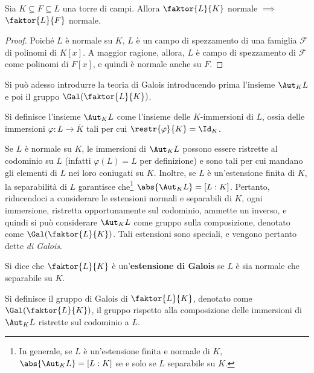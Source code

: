\documentclass[12pt]{scrartcl}
\begin{document}
	\begin{proposition}
		Sia $K \subseteq F \subseteq L$ una torre di campi. Allora
		$\faktor{L}{K}$ normale $\implies$ $\faktor{L}{F}$
		normale.
	\end{proposition}

	\begin{proof}
		Poiché $L$ è normale su $K$, $L$ è un campo di
		spezzamento di una famiglia $\mathcal{F}$ di polinomi
		di $K[x]$. A maggior ragione, allora,
		$L$ è campo di spezzamento di $\mathcal{F}$ come
		polinomi di $F[x]$, e quindi è normale anche su $F$.
	\end{proof} \medskip

	Si può adesso introdurre la teoria di Galois introducendo
	prima l'insieme $\Aut_K L$ e poi il gruppo $\Gal(\faktor{L}{K})$.
	
	\begin{definition}
		Si definisce l'insieme $\Aut_K L$ come l'insieme
		delle $K$-immersioni di $L$, ossia delle immersioni
		$\varphi : L \to \overline{K}$ tali per cui
		$\restr{\varphi}{K} = \Id_K$.
	\end{definition}

	Se $L$ è normale su $K$, le immersioni di
	$\Aut_K L$ possono essere ristrette al codominio su
	$L$ (infatti $\varphi(L) = L$ per definizione) e sono
	tali per cui mandano gli elementi di $L$ nei loro
	coniugati su $K$. Inoltre, se $L$ è un'estensione finita
	di $K$, la separabilità di $L$ garantisce che\footnote{
		In generale, se $L$ è un'estensione finita e normale di $K$,
		$\abs{\Aut_K L} = [L : K]$ se e solo se $L$
		separabile su $K$.
	}
	$\abs{\Aut_K L} = [L : K]$. Pertanto, riducendoci a
	considerare le estensioni normali e separabili di $K$,
	ogni immersione, ristretta opportunamente sul codominio,
	ammette un inverso, e quindi si può considerare
	$\Aut_K L$ come gruppo sulla composizione, denotato
	come $\Gal(\faktor{L}{K})$. Tali estensioni sono
	speciali, e vengono pertanto dette \textit{di Galois}.
	
	\begin{definition}
		Si dice che $\faktor{L}{K}$ è un'\textbf{estensione
		di Galois} se $L$ è sia normale che separabile su $K$.
	\end{definition}

	\begin{definition}
		Si definisce il gruppo di Galois di $\faktor{L}{K}$,
		denotato come $\Gal(\faktor{L}{K})$, il gruppo
		rispetto alla composizione
		delle immersioni di $\Aut_K L$ ristrette sul codominio
		a $L$.
	\end{definition}
\end{document}
